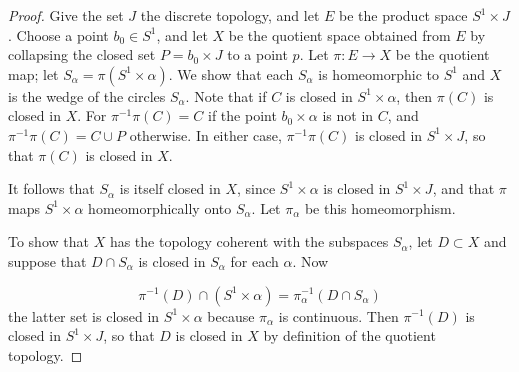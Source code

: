 \begin{proof}
Give the set \(J\) the discrete topology, and let \(E\) be the product space \(S^{1} \times J\). Choose a point \(b_{0} \in {S}^{1}\), and let \(X\) be the quotient space obtained from \(E\) by collapsing the closed set \(P = b_{0} \times J\) to a point \(p\). Let \(\pi : E \rightarrow X\) be the quotient map; let \(S_{\alpha } = \pi ( {S^{1} \times \alpha })\). We show that each \(S_{\alpha }\) is homeomorphic to \(S^{1}\) and \(X\) is the wedge of the circles \(S_{\alpha }\).
Note that if \(C\) is closed in \(S^{1} \times \alpha\), then \(\pi ( C)\) is closed in \(X\). For \({\pi }^{-1}\pi ( C) = C\) if the point \(b_{0} \times \alpha\) is not in \(C\), and \({\pi }^{-1}\pi ( C) = C \cup P\) otherwise. In either case, \({\pi }^{-1}\pi ( C)\) is closed in \(S^{1} \times J\), so that \(\pi ( C)\) is closed in \(X\).

It follows that \(S_{\alpha }\) is itself closed in \(X\), since \(S^{1} \times \alpha\) is closed in \(S^{1} \times J\), and that \(\pi\) maps \(S^{1} \times \alpha\) homeomorphically onto \(S_{\alpha }\). Let \({\pi }_{\alpha }\) be this homeomorphism.

To show that \(X\) has the topology coherent with the subspaces \(S_{\alpha }\), let \(D \subset X\) and suppose that \(D \cap {S}_{\alpha }\) is closed in \(S_{\alpha }\) for each \(\alpha\). Now

\[
{\pi }^{-1}( D) \cap ( {S^{1} \times \alpha }) = {\pi }_{\alpha }^{-1}( {D \cap {S}_{\alpha }})
\]
the latter set is closed in \(S^{1} \times \alpha\) because \({\pi }_{\alpha }\) is continuous. Then \({\pi }^{-1}( D)\) is closed in \(S^{1} \times J\), so that \(D\) is closed in \(X\) by definition of the quotient topology.
\end{proof}
